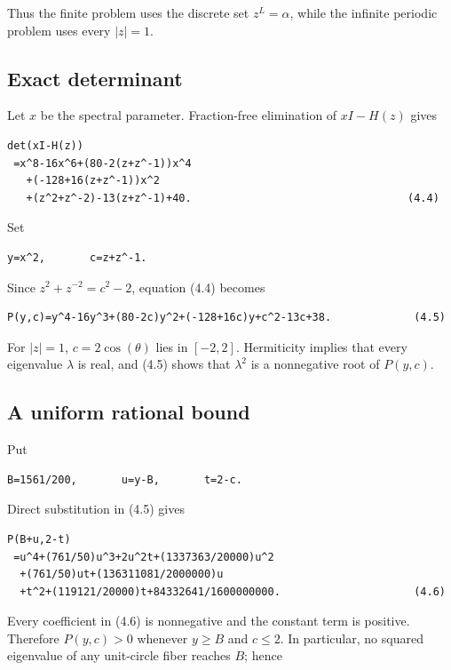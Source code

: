 Thus the finite problem uses the discrete set \(z^L=\alpha\), while the infinite
periodic problem uses every \(|z|=1\).

\subsection{Exact determinant}

Let \(x\) be the spectral parameter. Fraction-free elimination of
\(xI-H(z)\) gives

\begin{lstlisting}[language={}]
det(xI-H(z))
 =x^8-16x^6+(80-2(z+z^-1))x^4
   +(-128+16(z+z^-1))x^2
   +(z^2+z^-2)-13(z+z^-1)+40.                                  (4.4)
\end{lstlisting}

Set

\begin{lstlisting}[language={}]
y=x^2,       c=z+z^-1.
\end{lstlisting}

Since \(z^2+z^{-2}=c^2-2\), equation (4.4) becomes

\begin{lstlisting}[language={}]
P(y,c)=y^4-16y^3+(80-2c)y^2+(-128+16c)y+c^2-13c+38.             (4.5)
\end{lstlisting}

For \(|z|=1\), \(c=2\operatorname{cos}(\theta)\) lies in \([-2,2]\). Hermiticity implies that every
eigenvalue \(\lambda\) is real, and (4.5) shows that \(\lambda^2\) is a nonnegative
root of \(P(y,c)\).

\subsection{A uniform rational bound}

Put

\begin{lstlisting}[language={}]
B=1561/200,       u=y-B,       t=2-c.
\end{lstlisting}

Direct substitution in (4.5) gives

\begin{lstlisting}[language={}]
P(B+u,2-t)
 =u^4+(761/50)u^3+2u^2t+(1337363/20000)u^2
  +(761/50)ut+(136311081/2000000)u
  +t^2+(119121/20000)t+84332641/1600000000.                     (4.6)
\end{lstlisting}

Every coefficient in (4.6) is nonnegative and the constant term is positive.
Therefore \(P(y,c)>0\) whenever \(y\ge B\) and \(c\le 2\). In particular, no squared
eigenvalue of any unit-circle fiber reaches \(B\); hence

